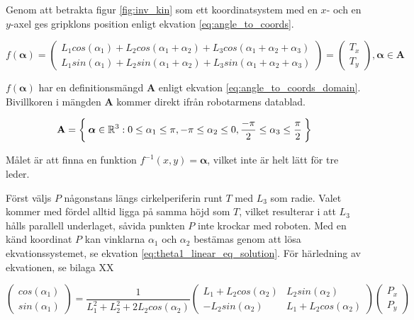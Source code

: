 
Genom att betrakta figur \ref{fig:inv_kin} som ett koordinatsystem med en $x$- och en $y$-axel ges gripklons position enligt ekvation \ref{eq:angle_to_coords}.

\begin{equation}
	\label{eq:angle_to_coords}
	f(\boldsymbol{\alpha})
	=
	\begin{pmatrix}
		L_{1}cos(\alpha_{1}) + L_{2}cos(\alpha_{1} + \alpha_{2}) + L_{3}cos(\alpha_{1} + \alpha_{2} + \alpha_{3})\\
		L_{1}sin(\alpha_{1}) + L_{2}sin(\alpha_{1} + \alpha_{2}) + L_{3}sin(\alpha_{1} + \alpha_{2} + \alpha_{3})
	\end{pmatrix}
	=
	\begin{pmatrix}
		T_x \\
		T_y
	\end{pmatrix}
	,
	\boldsymbol{\alpha}
	\in
	\mathbf{A}
\end{equation}

$f(\boldsymbol{\alpha})$ har en definitionsmängd $\mathbf{A}$ enligt ekvation \ref{eq:angle_to_coords_domain}. Bivillkoren i mängden $\mathbf{A}$ kommer direkt ifrån robotarmens datablad.

\begin{equation}
	\label{eq:angle_to_coords_domain}
	\mathbf{A}
	=
	\Set{
		\boldsymbol{\alpha} \in \mathbb{R}^{3} :
			0 \leq \alpha_1 \leq \pi,
			-\pi \leq \alpha_2 \leq 0,
			\frac{-\pi}{2} \leq \alpha_3 \leq \frac{\pi}{2}}
\end{equation}

Målet är att finna en funktion $f^{-1}(x, y) = \boldsymbol{\alpha}$, vilket inte är helt lätt för tre leder.

Först väljs $P$ någonstans längs cirkelperiferin runt $T$ med $L_3$ som radie. Valet kommer med fördel alltid ligga på samma höjd som $T$, vilket resulterar i att $L_3$ hålls parallell underlaget, såvida punkten $P$ inte krockar med roboten. Med en känd koordinat $P$ kan vinklarna $\alpha_{1}$ och $\alpha_{2}$ bestämas genom att lösa ekvationssystemet, se ekvation \ref{eq:theta1_linear_eq_solution}. För härledning av ekvationen, se bilaga XX

\begin{equation}
	\label{eq:theta1_linear_eq_solution}
	\begin{pmatrix}
		cos(\alpha_{1})\\
		sin(\alpha_{1})
	\end{pmatrix}
	=
	\frac{1}{L_1^2 + L_2^2 + 2 L_2 cos(\alpha_{2})}
	\begin{pmatrix}
		L_1 + L_2 cos(\alpha_{2}) & L_2 sin(\alpha_{2})\\
		-L_2 sin(\alpha_{2}) & L_1 + L_2 cos(\alpha_{2})
	\end{pmatrix}
	\begin{pmatrix}
		P_x \\
		P_y
	\end{pmatrix}
\end{equation}

